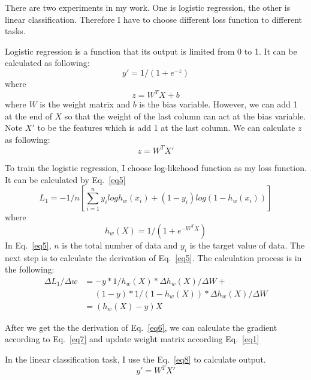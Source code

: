 \documentclass[journal, a4paper]{IEEEtran}
\begin{document}
There are two experiments in my work. One is logistic regression, the other is linear classification. Therefore I have to choose different loss function to different tasks.

Logistic regression is a function that its output is limited from 0 to 1. It can be calculated as following:
\begin{equation}
y' = 1/(1+e^{-z}) \label{eq2}
\end{equation}
where
\begin{equation}
z = W^TX+b \label{eq3}
\end{equation}
where $W$ is the weight matrix and $b$ is the bias variable. However, we can add 1 at the end of $X$ so that the weight of the last column can act at the bias variable. Note $X'$ to be the features which is add 1 at the last column. We can calculate $z$ as following:
 \begin{equation}
z = W^TX' \label{eq4}
\end{equation}

To train the logistic regression, I choose log-likehood function as my loss function. It can be calculated by Eq.~\eqref{eq5}
\begin{equation}
L_1 = -1/n[\sum_{i=1}^ny_ilog h_w(x_i) + (1-y_i)log(1-h_w(x_i))] \label{eq5}
\end{equation}
where
\begin{equation}
h_w(X) = 1/(1+e^{-W^TX}) \label{eq6}
\end{equation}
In Eq.~\eqref{eq5}, $n$ is the total number of data and $y_i$ is the target value of data. The next step is to calculate the derivation of Eq.~\eqref{eq5}. The calculation process is in the following:
\begin{equation}
\begin{aligned}
\Delta L_1 / \Delta w & = -y*1/h_w(X)*{\Delta h_w(X)}/{\Delta W} + \\
& \quad \ (1-y)*1/(1-h_w(X))*{\Delta h_w(X)}/{\Delta W} \\
& =(h_w(X)-y)X
\label{eq7}
\end{aligned}
\end{equation}

After we get the the derivation of Eq.~\eqref{eq6}, we can calculate the gradient according to Eq.~\eqref{eq7} and update weight matrix according Eq.~\eqref{eq1}

In the linear classification task, I use the Eq.~\eqref{eq8} to calculate output.
\begin{equation}
y' = W^TX' \label{eq8}
\end{equation}
\end{document}
